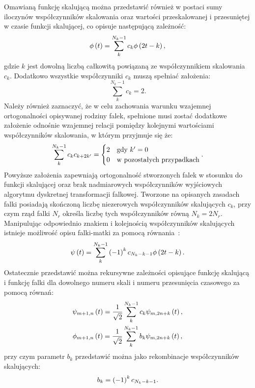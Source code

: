 Omawianą funkcję skalującą można przedstawić również w postaci sumy iloczynów współczynników skalowania oraz wartości przeskalowanej i przesuniętej w czasie funkcji skalującej, co opisuje następującą zależność:
\begin{equation}
\phi \left(t\right) = \sum _{k} ^{N_k-1} c_{k} \phi \left( 2t - k \right) \label{eq:dwt_scalefunrek},
\end{equation}
gdzie $k$ jest dowolną liczbą całkowitą powiązaną ze współczynnikiem skalowania $c_k$. Dodatkowo wszystkie współczynniki $c_k$ muszą spełniać założenia:
\begin{equation}
\sum _{k} ^{N_k-1} c_{k} = 2 \label{eq:dwt_scalefunsum}.
\end{equation}
Należy również zaznaczyć, że w celu zachowania warunku wzajemnej ortogonalności opisywanej rodziny falek, spełnione musi zostać dodatkowe założenie odnośnie wzajemnej relacji pomiędzy kolejnymi wartościami współczynników skalowania, w którym przyjmuje się że:
\begin{equation}
\sum _{k} ^{N_k-1} c_{k} c_{k+2k'} =
\begin{cases}
	2 & $gdy$~k' = 0 \\
	0 & $w pozostałych przypadkach$
\end{cases}
\label{eq:dwt_scalemulort}.
\end{equation}
Powyższe założenia zapewniają ortogonalność stworzonych falek w stosunku do funkcji skalującej oraz brak nadmiarowych współczynników wyjściowych algorytmu dyskretnej transformacji falkowej. Tworzone na opisanych zasadach falki posiadają skończoną liczbę niezerowych współczynników skalujących $c_k$, przy czym rząd falki $N_r$ określa liczbę tych współczynników równą $N_{k} = 2 N_r$. Manipulując odpowiednio znakiem i kolejnością współczynników skalujących istnieje możliwość opisu falki-matki za pomocą równania~\cite{wallen_handbook}:
\begin{equation}
\psi \left(t\right) = \sum _{k} ^{N_k-1} \left(-1\right) ^{k} c_{N_k-k-1} \phi \left( 2t - k \right) \label{eq:dwt_waveletfunrek}.
\end{equation}
Ostatecznie przedstawić można rekursywne zależności opisujące funkcję skalującą i funkcję falki dla dowolnego numeru skali i numeru przesunięcia czasowego za pomocą równań:
\begin{gather}
\psi_{m+1,n} \left(t\right) = \frac{1}{\sqrt{2}} \sum _{k} ^{N_k-1} c_{k} \psi_{m,2n+k} \left(t\right) \label{eq:dwt_fatherrek}, \\
\phi_{m+1,n} \left(t\right) = \frac{1}{\sqrt{2}} \sum _{k} ^{N_k-1} b_{k} \psi_{m,2n+k} \left(t\right) \label{eq:dwt_matherrek},
\end{gather}
przy czym parametr $b_{k}$ przedstawić można jako rekombinacje współczynników skalujących:
\begin{equation}
b_{k} = \left(-1\right) ^{k} c_{N_k-k-1} \label{eq:dwt_bk}.
\end{equation}


